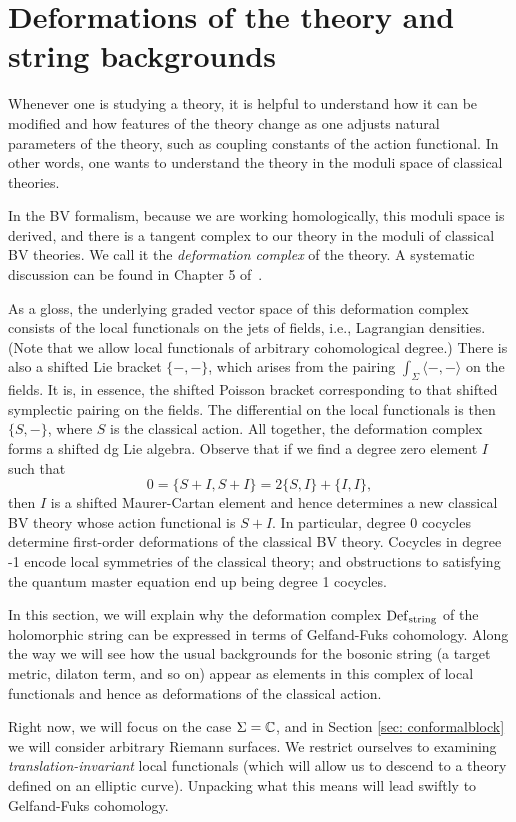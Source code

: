 \section{Deformations of the theory and string backgrounds}
\label{sec: moduli}

Whenever one is studying a theory,
it is helpful to understand how it can be modified 
and how features of the theory change as one adjusts natural parameters of the theory,
such as coupling constants of the action functional.
In other words, one wants to understand the theory in the moduli space of classical theories.

In the BV formalism, because we are working homologically, this moduli space is derived,
and there is a tangent complex to our theory in the moduli of classical BV theories.
We call it the {\em deformation complex} of the theory.
A systematic discussion can be found in Chapter 5 of~\cite{CosBook}.

As a gloss, the underlying graded vector space of this deformation complex consists of the local functionals on the jets of fields, i.e., Lagrangian densities.
(Note that we allow local functionals of arbitrary cohomological degree.) 
There is also a shifted Lie bracket $\{-,-\}$, 
which arises from the pairing $\int_\Sigma \langle-,-\rangle$ on the fields.
It is, in essence, the shifted Poisson bracket corresponding to that shifted symplectic pairing on the fields.
The differential on the local functionals is then $\{S,-\}$, where $S$ is the classical action. 
All together, the deformation complex forms a shifted dg Lie algebra. 
Observe that if we find a degree zero element $I$ such that
\[
0=\{S +I,S +I\}=2\{S,I\}+\{I,I\},
\]
then $I$ is a shifted Maurer-Cartan element and 
hence determines a new classical BV theory whose action functional is $S + I$. 
In particular, degree 0 cocycles determine first-order deformations of the classical BV theory. Cocycles in degree -1 encode local symmetries of the classical theory; 
and obstructions to satisfying the quantum master equation end up being degree 1 cocycles.

In this section, we will explain why the deformation complex ${\rm Def}_{\rm string}$ of the holomorphic string 
can be expressed in terms of Gelfand-Fuks cohomology. 
Along the way we will see how the usual backgrounds for the bosonic string (a target metric, dilaton term, and so on) appear as elements in this complex of local functionals and hence as deformations of the classical action. 

Right now, we will focus on the case $\Sigma = \mathbb C$, 
and in Section \ref{sec: conformalblock} we will consider arbitrary Riemann surfaces.
We restrict ourselves to examining {\em translation-invariant} local functionals (which will allow us to descend to a theory defined on an elliptic curve).
Unpacking what this means will lead swiftly to Gelfand-Fuks cohomology.

